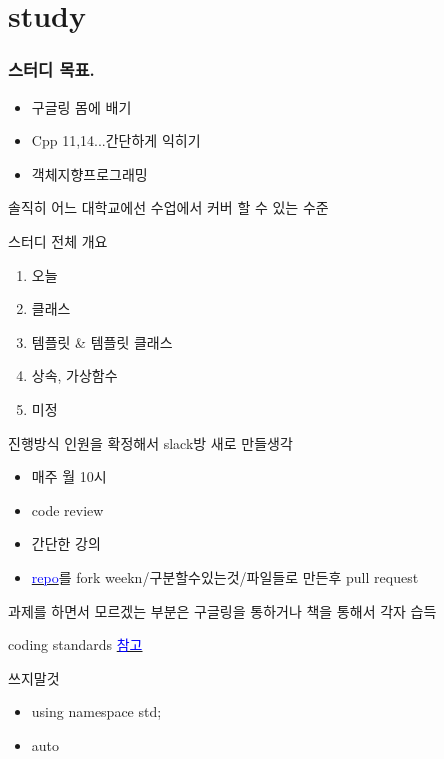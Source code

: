 \documentclass[10pt]{beamer}
\begin{document}
\section{study}


\begin{frame}[fragile] 
    \frametitle{스터디 목표.}
    \begin{itemize}
        \item 구글링 몸에 배기
        \item Cpp 11,14...간단하게 익히기
        \item 객체지향프로그래밍
    \end{itemize}
    솔직히 어느 대학교에선 수업에서 커버 할 수 있는 수준
\end{frame}

\begin{frame}{스터디 전체 개요}
    \begin{enumerate}
        \item 오늘
        \item 클래스
        \item 템플릿 \& 템플릿 클래스
        \item 상속, 가상함수
        \item 미정
    \end{enumerate}
\end{frame}

\begin{frame}{진행방식}
    인원을 확정해서 slack방 새로 만들생각

    \begin{itemize}
        \item 매주 월 10시
        \item code review
        \item 간단한 강의
        \item \href{https://github.com/EeeUnS/2020CppStudy}{\textcolor{blue}{repo}}를 fork weekn/구분할수있는것/파일들로 만든후 pull request
    \end{itemize}



    과제를 하면서 모르겠는 부분은 구글링을 통하거나 책을 통해서 각자 습득


\end{frame}    

\begin{frame}{coding standards}
    \href{https://github.com/popekim/dev-docs-ko/blob/master/coding-standards/cpp.md}{\textcolor{blue}{참고}}

    
    쓰지말것
    \begin{itemize}
        \item using namespace  std;
        \item auto
    \end{itemize}
\end{frame}    
\end{document}
